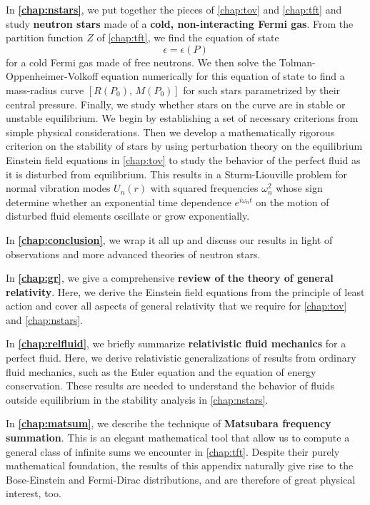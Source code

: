 In \textbf{\cref{chap:nstars}}, we put together the pieces of \cref{chap:tov} and \cref{chap:tft} and study \textbf{neutron stars} made of a \textbf{cold, non-interacting Fermi gas}.
From the partition function $Z$ of \cref{chap:tft}, we find the equation of state
\begin{equation*}
	\epsilon = \epsilon(P)
\end{equation*}
for a cold Fermi gas made of free neutrons.
We then solve the Tolman-Oppenheimer-Volkoff equation numerically for this equation of state to find a mass-radius curve $[R(P_0), \, M(P_0)]$ for such stars parametrized by their central pressure.
Finally, we study whether stars on the curve are in stable or unstable equilibrium.
We begin by establishing a set of necessary criterions from simple physical considerations.
Then we develop a mathematically rigorous criterion on the stability of stars by using perturbation theory on the equilibrium Einstein field equations in \cref{chap:tov} to study the behavior of the perfect fluid as it is disturbed from equilibrium.
This results in a Sturm-Liouville problem for normal vibration modes $U_n(r)$ with squared frequencies $\omega_n^2$ whose sign determine whether an exponential time dependence $e^{i \omega_n t}$ on the motion of disturbed fluid elements oscillate or grow exponentially.


In \textbf{\cref{chap:conclusion}}, we wrap it all up and discuss our results in light of observations and more advanced theories of neutron stars.

In \textbf{\cref{chap:gr}}, we give a comprehensive \textbf{review of the theory of general relativity}.
Here, we derive the Einstein field equations from the principle of least action and cover all aspects of general relativity that we require for \cref{chap:tov} and \cref{chap:nstars}.

In \textbf{\cref{chap:relfluid}}, we briefly summarize \textbf{relativistic fluid mechanics} for a perfect fluid.
Here, we derive relativistic generalizations of results from ordinary fluid mechanics, such as the Euler equation and the equation of energy conservation.
These results are needed to understand the behavior of fluids outside equilibrium in the stability analysis in \cref{chap:nstars}.

In \textbf{\cref{chap:matsum}}, we describe the technique of \textbf{Matsubara frequency summation}.
This is an elegant mathematical tool that allow us to compute a general class of infinite sums we encounter in \cref{chap:tft}.
Despite their purely mathematical foundation, the results of this appendix naturally give rise to the Bose-Einstein and Fermi-Dirac distributions, and are therefore of great physical interest, too.

